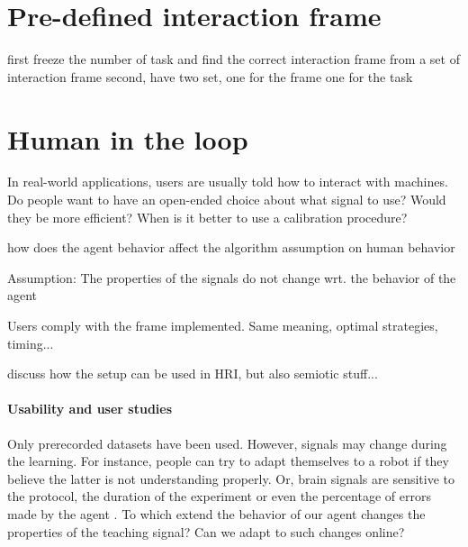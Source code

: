 \section{Pre-defined interaction frame}
first freeze the number of task and find the correct interaction frame from a set of interaction frame
second, have two set, one for the frame one for the task

\section{Human in the loop}

In real-world applications, users are usually told how to interact with machines. Do people want to have an open-ended choice about what signal to use? Would they be more efficient? When is it better to use a calibration procedure?

how does the agent behavior affect the algorithm assumption on human behavior

Assumption: The properties of the signals do not change wrt. the behavior of the agent

Users comply with the frame implemented. Same meaning, optimal strategies, timing...

discuss how the setup can be used in HRI, but also semiotic stuff...

\paragraph{Usability and user studies}

Only prerecorded datasets have been used. However, signals may change during the learning. For instance, people can try to adapt themselves to a robot if they believe the latter is not understanding properly. Or, brain signals are sensitive to the protocol, the duration of the experiment or even the percentage of errors made by the agent \cite{chavarriaga2010learning}. To which extend the behavior of our agent changes the properties of the teaching signal? Can we adapt to such changes online? 


